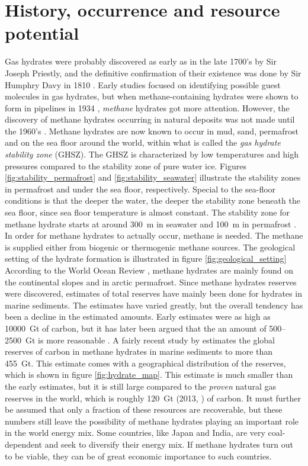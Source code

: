 \section{History, occurrence and resource potential}
Gas hydrates were probably discovered as early as in the late 1700's by Sir Joseph Priestly, and the definitive confirmation of their existence was done by Sir Humphry Davy in 1810 \cite{Hester2009}. Early studies focused on identifying possible guest molecules in gas hydrates, but when methane-containing hydrates were shown to form in pipelines in 1934 \cite{Hammerschmidt1934}, \emph{methane} hydrates got more attention. However, the discovery of methane hydrates occurring in natural deposits was not made until the 1960's \cite{Makogon200714}. Methane hydrates are now known to occur in mud, sand, permafrost and on the sea floor around the world, within what is called the \emph{gas hydrate stability zone} (GHSZ). The GHSZ is characterized by low temperatures and high pressures compared to the stability zone of pure water ice. Figures \ref{fig:stability_permafrost} and \ref{fig:stability_seawater} illustrate the stability zones in permafrost and under the sea floor, respectively. Special to the sea-floor conditions is that the deeper the water, the deeper the stability zone beneath the sea floor, since sea floor temperature is almost constant. The stability zone for methane hydrate starts at around \SI{300}{\meter} in seawater and \SI{100}{\meter} in permafrost \cite{Hester2009}. In order for methane hydrates to actually occur, methane is needed. The methane is supplied either from biogenic or thermogenic methane sources. The geological setting of the hydrate formation is illustrated in figure \ref{fig:geological_setting} According to the World Ocean Review \cite{Bucker2014}, methane hydrates are mainly found on the continental slopes and in arctic permafrost.  Since methane hydrates reserves were discovered, estimates of total reserves have mainly been done for hydrates in marine sediments. The estimates have varied greatly, but the overall tendency has been a decline in the estimated amounts. Early estimates were as high as \SI{10000}{\giga\tonne} of carbon, but it has later been argued that the an amount of 500–\SI{2500}{\giga\tonne} is more reasonable \cite{Milkov2004183}. A fairly recent study by \citet{Wallmann2012} estimates the global reserves of carbon in methane hydrates in marine sediments to more than \SI{455}{\giga\tonne}. This estimate comes with a geographical distribution of the reserves, which is shown in figure \ref{fig:hydrate_map}. This estimate is much smaller than the early estimates, but it is still large compared to the \emph{proven} natural gas reserves in the world, which is roughly \SI{120}{\giga\tonne} (2013, \cite{CIA2013}) of carbon. It must further be assumed that only a fraction of these resources are recoverable, but these numbers still leave the possibility of methane hydrates playing an important role in the world energy mix. Some countries, like Japan and India, are very coal-dependent and seek to diversify their energy mix. If methane hydrates turn out to be viable, they can be of great economic importance to such countries. 


